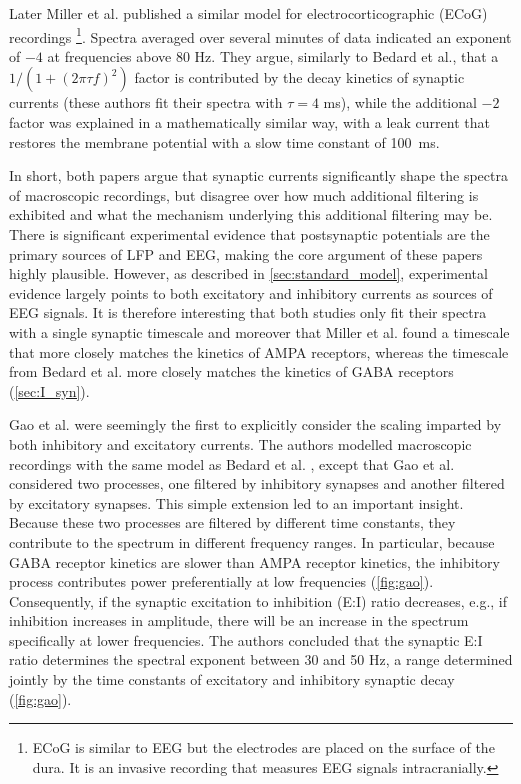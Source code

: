 Later Miller et al. \cite{Miller2009} published a similar model for electrocorticographic (ECoG) recordings \footnote[2]{ECoG is similar to EEG but the electrodes are placed on the surface of the dura. It is an invasive recording that measures EEG signals intracranially.}. Spectra averaged over several minutes of data indicated an exponent of $-4$ at frequencies above 80 Hz. They argue, similarly to Bedard et al., that a $1 / (1+ (2\pi\tau f)^2)$ factor is contributed by the decay kinetics of synaptic currents (these authors fit their spectra with $\tau=4$ \unit{\milli\second}), while the additional $-2$ factor was explained in a mathematically similar way, with a leak current that restores the membrane potential with a slow time constant of \qty{100}{\milli\second}.

In short, both papers argue that synaptic currents significantly shape the spectra of macroscopic recordings, but disagree over how much additional filtering is exhibited and what the mechanism underlying this additional filtering may be. There is significant experimental evidence that postsynaptic potentials are the primary sources of LFP and EEG, making the core argument of these papers highly plausible. However, as described in \autoref{sec:standard_model}, experimental evidence largely points to both excitatory and inhibitory currents as sources of EEG signals. It is therefore interesting that both studies only fit their spectra with a single synaptic timescale and moreover that Miller et al. \cite{Miller2009} found a timescale that more closely matches the kinetics of AMPA receptors, whereas the timescale from Bedard et al. \cite{Bedard2006} more closely matches the kinetics of GABA receptors (\autoref{sec:I_syn}).

Gao et al. \cite{Gao2017} were seemingly the first to explicitly consider the scaling imparted by both inhibitory and excitatory currents. The authors modelled macroscopic recordings with the same model as Bedard et al. \cite{Bedard2006}, except that Gao et al. considered two processes, one filtered by inhibitory synapses and another filtered by excitatory synapses. This simple extension led to an important insight. Because these two processes are filtered by different time constants, they contribute to the spectrum in different frequency ranges. In particular, because GABA receptor kinetics are slower than AMPA receptor kinetics, the inhibitory process contributes power preferentially at low frequencies (\autoref{fig:gao}). Consequently, if the synaptic excitation to inhibition (E:I) ratio decreases, e.g., if inhibition increases in amplitude, there will be an increase in the spectrum specifically at lower frequencies. The authors concluded that the synaptic E:I ratio determines the spectral exponent between 30 and 50 Hz, a range determined jointly by the time constants of excitatory and inhibitory synaptic decay (\autoref{fig:gao}).


